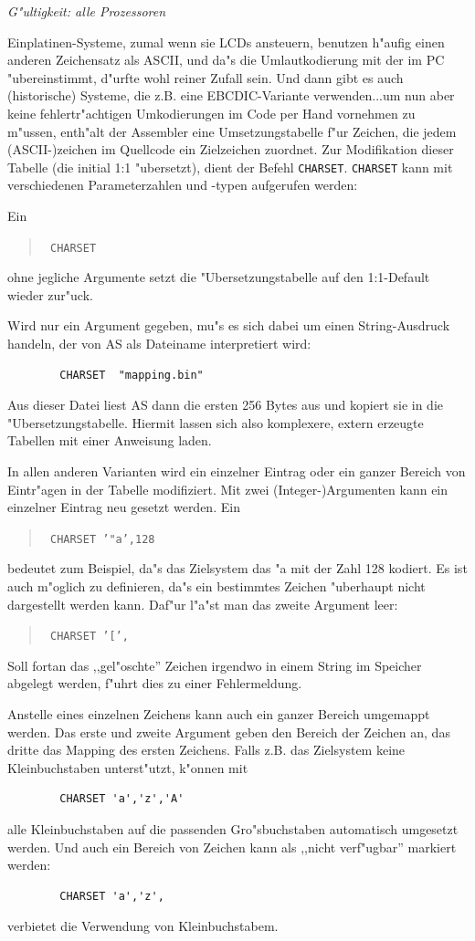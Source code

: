 \documentclass[12pt,a4paper,twoside]{report}
\newcommand{\tty}[1]{{\tt #1}}
\newcommand{\asname}{AS}
\begin{document}
{\em G"ultigkeit: alle Prozessoren}

Einplatinen-Systeme, zumal wenn sie LCDs ansteuern, benutzen h"aufig
einen anderen Zeichensatz als ASCII, und da"s die Umlautkodierung mit
der im PC "ubereinstimmt, d"urfte wohl reiner Zufall sein.  Und dann
gibt es auch (historische) Systeme, die z.B. eine EBCDIC-Variante
verwenden...um nun aber keine fehlertr"achtigen Umkodierungen im Code
per Hand vornehmen zu m"ussen, enth"alt der Assembler eine Umsetzungstabelle
f"ur Zeichen, die jedem (ASCII-)zeichen im Quellcode ein Zielzeichen zuordnet.
Zur Modifikation dieser Tabelle (die initial 1:1 "ubersetzt), dient der
Befehl \tty{CHARSET}.  \tty{CHARSET} kann mit verschiedenen Parameterzahlen
und -typen aufgerufen werden:

Ein
\begin{quote}{\tt
        CHARSET
}\end{quote}
ohne jegliche Argumente setzt die "Ubersetzungstabelle auf den 1:1-Default
wieder zur"uck.

Wird nur ein Argument gegeben, mu"s es sich dabei um einen String-Ausdruck
handeln, der von \asname{} als Dateiname interpretiert wird:
\begin{verbatim}
        CHARSET  "mapping.bin"
\end{verbatim}
Aus dieser Datei liest \asname{} dann die ersten 256 Bytes aus und kopiert sie in die
"Ubersetzungstabelle.  Hiermit lassen sich also komplexere, extern
erzeugte Tabellen mit einer Anweisung laden.

In allen anderen Varianten wird ein einzelner Eintrag oder ein ganzer
Bereich von Eintr"agen in der Tabelle modifiziert.  Mit zwei (Integer-)Argumenten
kann ein einzelner Eintrag neu gesetzt werden.  Ein
\begin{quote}{\tt
        CHARSET '"a',128
}\end{quote}
bedeutet zum Beispiel, da"s das Zielsystem das "a mit der Zahl 128 kodiert.
Es ist auch m"oglich zu definieren, da"s ein bestimmtes Zeichen "uberhaupt
nicht dargestellt werden kann.  Daf"ur l"a"st man das zweite Argument leer:
\begin{quote}{\tt
        CHARSET '[',
}\end{quote}
Soll fortan das ,,gel"oschte'' Zeichen irgendwo in einem String im Speicher
abgelegt werden, f"uhrt dies zu einer Fehlermeldung.

Anstelle eines einzelnen Zeichens kann auch ein ganzer Bereich umgemappt
werden.  Das erste und zweite Argument geben den Bereich der Zeichen an, das
dritte das Mapping des ersten Zeichens.  Falls z.B. das Zielsystem keine
Kleinbuchstaben unterst"utzt, k"onnen mit
\begin{verbatim}
        CHARSET 'a','z','A'
\end{verbatim}
alle Kleinbuchstaben auf die passenden Gro"sbuchstaben automatisch
umgesetzt werden.  Und auch ein Bereich von Zeichen kann als
,,nicht verf"ugbar'' markiert werden:
\begin{verbatim}
        CHARSET 'a','z',
\end{verbatim}
verbietet die Verwendung von Kleinbuchstabem.
\end{document}
